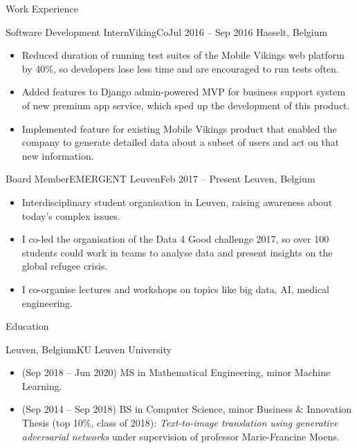 \documentclass[]{mcdowellcv}
\begin{document}
\begin{cvsection}{Work Experience}
\begin{cvsubsection}{Software Development Intern}{VikingCo}{Jul 2016 -- Sep 2016}
		Hasselt, Belgium
		\begin{itemize}%
			\item Reduced duration of running test suites of the Mobile Vikings web platform by 40\%, so developers lose less time and are encouraged to run tests often.
			\item Added features to \textquotedbl{}Django admin\textquotedbl{}-powered MVP for business support system of new premium app service, which sped up the development of this product.
			\item Implemented feature for existing Mobile Vikings product that enabled the company to generate detailed data about a subset of users and act on that new information.
		\end{itemize}
	\end{cvsubsection}
	\begin{cvsubsection}{Board Member}{EMERGENT Leuven}{Feb 2017 -- Present}
		Leuven, Belgium
		\begin{itemize}
			\item Interdisciplinary student organisation in Leuven, raising awareness about today’s complex issues.
			\item I co-led the organisation of the Data 4 Good challenge 2017, so over 100 students could work in teams to analyse data and present insights on the global refugee crisis.
			\item I co-organise lectures and workshops on topics like big data, AI, medical engineering.
		\end{itemize}
	\end{cvsubsection}
\end{cvsection}
\begin{cvsection}{Education}
	\begin{cvsubsection}{Leuven, Belgium}{KU Leuven University}{}
		\begin{itemize}
			\item (Sep 2018 -- Jun 2020) MS in Mathematical Engineering, minor Machine Learning.
			\item (Sep 2014 -- Sep 2018) BS in Computer Science, minor Business \& Innovation
			\\ Thesis (top 10\%, class of 2018): \emph{Text-to-image translation using generative adversarial networks} under supervision of professor Marie-Francine Moens.
		\end{itemize}
	\end{cvsubsection}
\end{cvsection}
\end{document}
